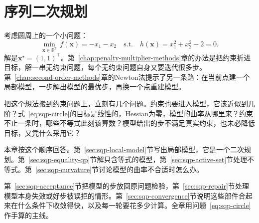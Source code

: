 \chapter{序列二次规划}
\label{chap:sequential-quadratic-programming}

考虑圆周上的一个小问题：
\begin{equation}
 \min_{\bm{x}\in\mathbb{R}^2}\ f(\bm{x})=-x_1-x_2
 \quad\text{s.t.}\quad h(\bm{x})=x_1^2+x_2^2-2=0.
 \label{eq:sqp-circle}
\end{equation}
解是$\bm{x}^\star=(1,1)^\top$。第~\ref{chap:penalty-multiplier-methods}章的办法是把约束折进目标，解一串无约束问题，每个无约束问题自身又要迭代很多步。第~\ref{chap:second-order-methods}章的Newton法提示了另一条路：在当前点建一个局部模型，一步解出模型的最优步，再换一个点重建模型。

把这个想法搬到约束问题上，立刻有几个问题。约束也要进入模型，它该近似到几阶？式~\eqref{eq:sqp-circle}的目标是线性的，Hessian为零，模型的曲率从哪里来？约束不止一条时，哪些不等式此刻该算数？模型给出的步不满足真实约束，也未必降低目标，又凭什么采用它？

本章按这个顺序回答。第~\ref{sec:sqp-local-model}节写出局部模型，它是一个二次规划。第~\ref{sec:sqp-equality-qp}节解只含等式的模型，第~\ref{sec:sqp-active-set}节处理不等式。第~\ref{sec:sqp-curvature}节讨论模型的曲率不合适时怎么办。

第~\ref{sec:sqp-acceptance}节把模型的步放回原问题检验，第~\ref{sec:sqp-repair}节处理模型本身失效或好步被误拒的情形。第~\ref{sec:sqp-convergence}节说明这些部件合起来在什么条件下收敛得快，以及每一轮要花多少计算。全章用问题~\eqref{eq:sqp-circle}作手算的主线。









